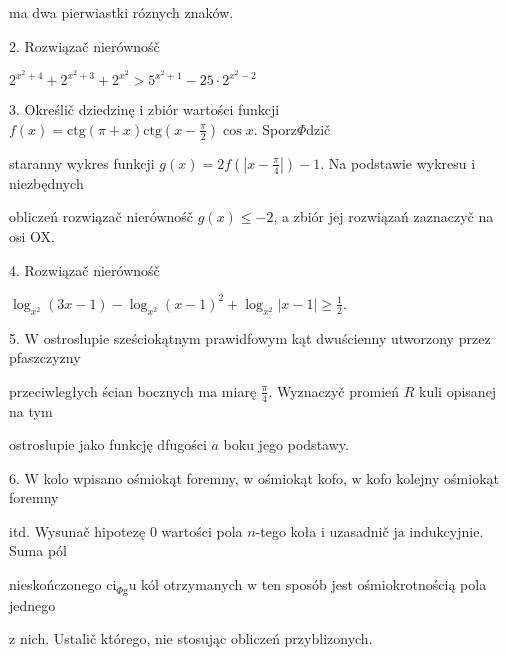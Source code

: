 \documentclass[a4paper,12pt]{article}
\begin{document}
ma dwa pierwiastki róznych znaków.

2. Rozwiązač nierównośč

$2^{x^{2}+4}+2^{x^{2}+3}+2^{x^{2}}>5^{x^{2}+1}-25\cdot 2^{x^{2}-2}$

3. Określič dziedzinę $\mathrm{i}$ zbiór wartości funkcji $f(x)=\displaystyle \mathrm{c}\mathrm{t}\mathrm{g}(\pi+x)\mathrm{c}\mathrm{t}\mathrm{g}(x-\frac{\pi}{2})\cos x$. Sporz$\Phi$dzič

staranny wykres funkcji $g(x) =2f(|x-\displaystyle \frac{\pi}{4}|)-1$. Na podstawie wykresu $\mathrm{i}$ niezbędnych

obliczeń rozwiązač nierównośč $g(x)\leq-2$, a zbiór jej rozwiązań zaznaczyč na osi OX.

4. Rozwiązač nierównośč

$\displaystyle \log_{x^{2}}(3x-1)-\log_{x^{2}}(x-1)^{2}+\log_{x^{2}}|x-1|\geq\frac{1}{2}.$

5. $\mathrm{W}$ ostroslupie sześciokątnym prawidfowym kąt dwuścienny utworzony przez pfaszczyzny

przeciwległych ścian bocznych ma miarę $\displaystyle \frac{\pi}{4}$. Wyznaczyč promień $R$ kuli opisanej na tym

ostroslupie jako funkcję dfugości $a$ boku jego podstawy.

6. $\mathrm{W}$ kolo wpisano ośmiokąt foremny, $\mathrm{w}$ ośmiokąt kofo, $\mathrm{w}$ kofo kolejny ośmiokąt foremny

itd. Wysunač hipotezę $0$ wartości pola $n$-tego koła $\mathrm{i}$ uzasadnič $\mathrm{j}\mathrm{a}$ indukcyjnie. Suma pól

nieskończonego $\mathrm{c}\mathrm{i}_{\Phi \mathrm{g}}\mathrm{u}$ kól otrzymanych $\mathrm{w}$ ten sposób jest ośmiokrotnością pola jednego

$\mathrm{z}$ nich. Ustalič którego, nie stosując obliczeń przyblizonych.
\end{document}
